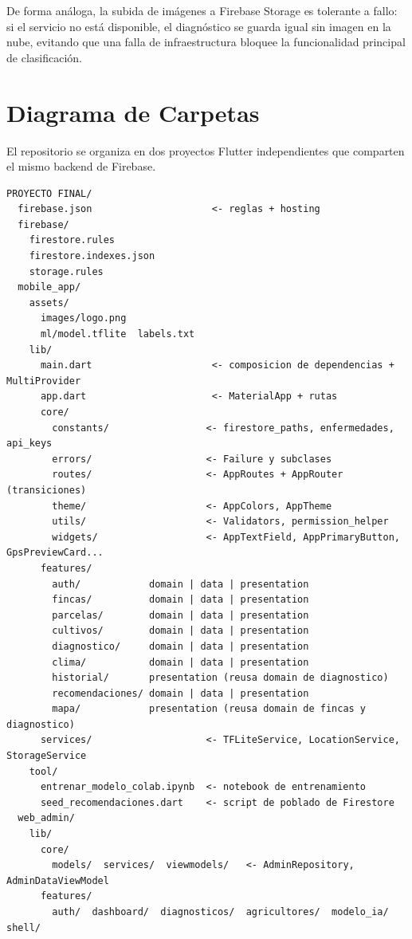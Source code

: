 \documentclass[12pt,a4paper]{article}
\begin{document}
De forma análoga, la subida de imágenes a Firebase Storage es tolerante a
fallo: si el servicio no está disponible, el diagnóstico se guarda igual sin
imagen en la nube, evitando que una falla de infraestructura bloquee la
funcionalidad principal de clasificación.

\section{Diagrama de Carpetas}

El repositorio se organiza en dos proyectos Flutter independientes que
comparten el mismo backend de Firebase.

{\small
\begin{verbatim}
PROYECTO FINAL/
  firebase.json                     <- reglas + hosting
  firebase/
    firestore.rules
    firestore.indexes.json
    storage.rules
  mobile_app/
    assets/
      images/logo.png
      ml/model.tflite  labels.txt
    lib/
      main.dart                     <- composicion de dependencias + MultiProvider
      app.dart                      <- MaterialApp + rutas
      core/
        constants/                 <- firestore_paths, enfermedades, api_keys
        errors/                    <- Failure y subclases
        routes/                    <- AppRoutes + AppRouter (transiciones)
        theme/                     <- AppColors, AppTheme
        utils/                     <- Validators, permission_helper
        widgets/                   <- AppTextField, AppPrimaryButton, GpsPreviewCard...
      features/
        auth/            domain | data | presentation
        fincas/          domain | data | presentation
        parcelas/        domain | data | presentation
        cultivos/        domain | data | presentation
        diagnostico/     domain | data | presentation
        clima/           domain | data | presentation
        historial/       presentation (reusa domain de diagnostico)
        recomendaciones/ domain | data | presentation
        mapa/            presentation (reusa domain de fincas y diagnostico)
      services/                    <- TFLiteService, LocationService, StorageService
    tool/
      entrenar_modelo_colab.ipynb  <- notebook de entrenamiento
      seed_recomendaciones.dart    <- script de poblado de Firestore
  web_admin/
    lib/
      core/
        models/  services/  viewmodels/   <- AdminRepository, AdminDataViewModel
      features/
        auth/  dashboard/  diagnosticos/  agricultores/  modelo_ia/  shell/
\end{verbatim}
}
\end{document}
